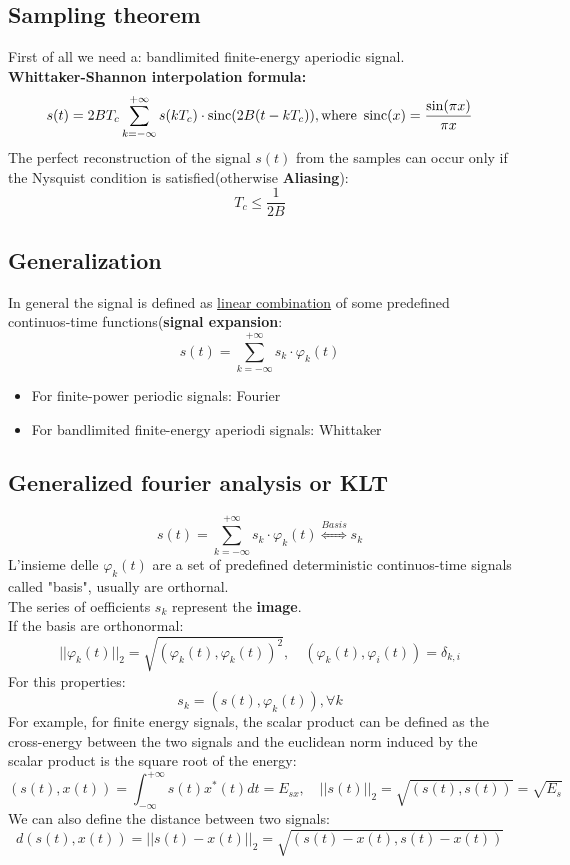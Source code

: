 \subsection{Sampling theorem}
First of all we need a: bandlimited finite-energy aperiodic signal.\\
\textbf{Whittaker-Shannon interpolation formula:}
\[s(t)=2B T_c\sum_{k=-\infty}^{+\infty}s(kT_c)\cdot \text{sinc}(2B(t-kT_c)), \text{where} \hspace{0.5 em}\text{sinc}(x)=\frac{\sin(\pi x)}{\pi x}\]
The perfect reconstruction of the signal \(s(t)\) from the samples can occur only if the Nysquist condition is satisfied(otherwise \textbf{Aliasing}):
\[
T_c\leq\frac{1}{2B}
\]
\subsection{Generalization}
In general the signal is defined as \underline{linear combination} of some predefined continuos-time functions(\textbf{signal expansion}:
\[
s(t)=\sum_{k=-\infty}^{+\infty} s_k\cdot\varphi_k(t)
\]
\begin{itemize}
    \item For finite-power periodic signals: Fourier
    \item For bandlimited finite-energy aperiodi signals: Whittaker
\end{itemize}
\subsection{Generalized fourier analysis or KLT}
\[
s(t)=\sum_{k=-\infty}^{+\infty}s_k\cdot\varphi_k(t)\overset{Basis}{\Longleftrightarrow}s_k
\]
L'insieme delle \(\varphi_k(t)\) are a set of predefined deterministic continuos-time signals called "basis", usually are orthornal.\\
The series of oefficients \(s_k\) represent the \textbf{image}.\\
If the basis are orthonormal:
\[
||\varphi_k(t)||_2=\sqrt{(\varphi_k(t),\varphi_k(t))^2}, \hspace{1em}(\varphi_k(t),\varphi_i(t))=\delta_{k,i}
\]
For this properties:
\[
s_k=(s(t),\varphi_k(t)), \forall k
\]
For example, for finite energy signals, the scalar product can be defined as the cross-energy between the two signals and the euclidean norm induced by the scalar product is the square root of the energy:
\[
(s(t),x(t))=\int_{-\infty}^{+\infty}s(t)x^*(t)dt=E_{sx}, \hspace{1em} ||s(t)||_2=\sqrt{(s(t),s(t))}=\sqrt{E_s}
\]
We can also define the distance between two signals:
\[
d(s(t),x(t))=||s(t)-x(t)||_2=\sqrt{(s(t)-x(t),s(t)-x(t))}
\]

